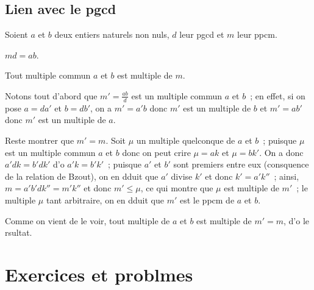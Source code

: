 \documentclass[a4paper,fleqn,openany]{trmbook}
\begin{document}
\subsection{Lien avec le pgcd}

\begin{propriete}
Soient $a$ et $b$ deux entiers naturels non nuls, $d$ leur pgcd et $m$ leur ppcm.
\begin{sousproprietes}
    \item $md = ab$.
    \item Tout multiple commun  $a$ et $b$ est multiple de $m$.
\end{sousproprietes}
\end{propriete}

\begin{demonstration}
\begin{sousdemonstration}
    \item Notons tout d'abord que $m' = \frac{ab}{d}$ est un multiple commun  $a$ et $b$~; en effet, si on pose $a = da'$ et $b = db'$, on a $m' = a'b$ donc $m'$ est un multiple de $b$ et $m' = ab'$ donc $m'$ est un multiple de $a$.

Reste  montrer que $m' = m$. Soit $\mu$ un multiple quelconque de $a$ et $b$~; puisque $\mu$ est un multiple commun  $a$ et $b$ donc on peut crire $\mu = ak$ et $\mu = bk'$. On a donc $a'dk = b'dk'$ d'o $a'k = b'k'$~; puisque $a'$ et $b'$ sont premiers entre eux (consquence de la relation de Bzout), on en dduit que $a'$ divise $k'$ et donc $k' = a' k''$~; ainsi, $m = a'b'd k'' = m' k''$ et donc $m' \leq \mu$, ce qui montre que $\mu$ est multiple de $m'$~; le multiple $\mu$ tant arbitraire, on en dduit que $m'$ est le ppcm de $a$ et $b$.
    \item Comme on vient de le voir, tout multiple de $a$ et $b$ est multiple de $m' = m$, d'o le rsultat.
\end{sousdemonstration}
\end{demonstration}

\modeexercice
\section{Exercices et problmes}
\end{document}
